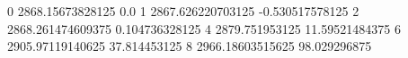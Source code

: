 0 2868.15673828125 0.0
1 2867.626220703125 -0.530517578125
2 2868.261474609375 0.104736328125
4 2879.751953125 11.59521484375
6 2905.97119140625 37.814453125
8 2966.18603515625 98.029296875
